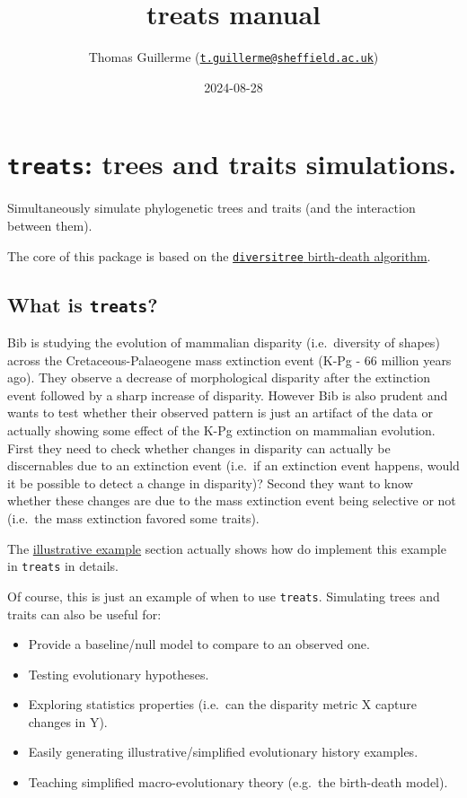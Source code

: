\documentclass[
]{book}
\title{treats manual}
\author{Thomas Guillerme (\href{mailto:t.guillerme@sheffield.ac.uk}{\nolinkurl{t.guillerme@sheffield.ac.uk}})}
\date{2024-08-28}
\providecommand{\tightlist}{%
  \setlength{\itemsep}{0pt}\setlength{\parskip}{0pt}}
\begin{document}
\maketitle

{
\setcounter{tocdepth}{1}
\tableofcontents
}
\hypertarget{treats-trees-and-traits-simulations.}{%
\chapter{\texorpdfstring{\texttt{treats}: trees and traits simulations.}{treats: trees and traits simulations.}}\label{treats-trees-and-traits-simulations.}}

Simultaneously simulate phylogenetic trees and traits (and the interaction between them).

The core of this package is based on the \href{https://github.com/cran/diversitree/blob/master/R/simulate-bd.R}{\texttt{diversitree} birth-death algorithm}.

\hypertarget{what-is-treats}{%
\section{\texorpdfstring{What is \texttt{treats}?}{What is treats?}}\label{what-is-treats}}

Bib is studying the evolution of mammalian disparity (i.e.~diversity of shapes) across the Cretaceous-Palaeogene mass extinction event (K-Pg - 66 million years ago).
They observe a decrease of morphological disparity after the extinction event followed by a sharp increase of disparity.
However Bib is also prudent and wants to test whether their observed pattern is just an artifact of the data or actually showing some effect of the K-Pg extinction on mammalian evolution.
First they need to check whether changes in disparity can actually be discernables due to an extinction event (i.e.~if an extinction event happens, would it be possible to detect a change in disparity)?
Second they want to know whether these changes are due to the mass extinction event being selective or not (i.e.~the mass extinction favored some traits).

The \protect\hyperlink{kpgexample}{illustrative example} section actually shows how do implement this example in \texttt{treats} in details.

Of course, this is just an example of when to use \texttt{treats}.
Simulating trees and traits can also be useful for:

\begin{itemize}
\tightlist
\item
  Provide a baseline/null model to compare to an observed one.
\item
  Testing evolutionary hypotheses.
\item
  Exploring statistics properties (i.e.~can the disparity metric X capture changes in Y).
\item
  Easily generating illustrative/simplified evolutionary history examples.
\item
  Teaching simplified macro-evolutionary theory (e.g.~the birth-death model).
\end{itemize}
\end{document}
